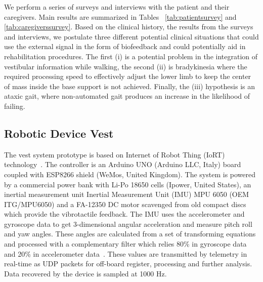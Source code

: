 \documentclass[conference]{IEEEtran}
\begin{document}
We perform a series of surveys and interviews with the patient and their caregivers.  Main results are summarized in 
Tables ~\ref{tab:patientsurvey} and \ref{tab:caregiverssurvey}.  Based on the clinical history, the results from the surveys and interviews, we postulate three different potential clinical situations that could use the external signal in the form of biofeedback and could potentially aid in rehabilitation procedures.  The first (i) is a potential problem in the integration of vestibular information while walking, the second (ii) is bradykinesia where the required processing speed to effectively adjust the lower limb to keep the center of mass inside the base support is not achieved.  Finally, the (iii) hypothesis is an ataxic gait, where non-automated gait produces an increase in the likelihood of failing.


%

\subsection{Robotic Device Vest}
\label{sec:vest}

The vest system prototype is based on Internet of Robot Thing (IoRT) technology~\cite{Simoens.etal2018,Domingo.etal2012}. The controller is an Arduino UNO (Arduino LLC, Italy) board coupled with ESP8266 shield (WeMos, United Kingdom).  The system is powered by a commercial power bank with Li-Po 18650 cells (Ipower, United States), an inertial measurement unit Inertial Measurement Unit (IMU) MPU 6050 (OEM ITG/MPU6050) and a FA-12350 DC motor scavenged from old compact discs which provide the vibrotactile feedback.  The IMU uses the accelerometer and gyroscope data to get 3-dimensional angular acceleration and measure pitch roll and yaw angles. These angles are calculated from a set of transforming equations and processed with a complementary filter which relies 80\% in gyroscope data and 20\% in accelerometer data~\cite{Fetick.2022}. These values are transmitted by telemetry in real-time as UDP packets for off-board register, processing and further analysis. Data recovered by the device is sampled at 1000 Hz. 
\end{document}
